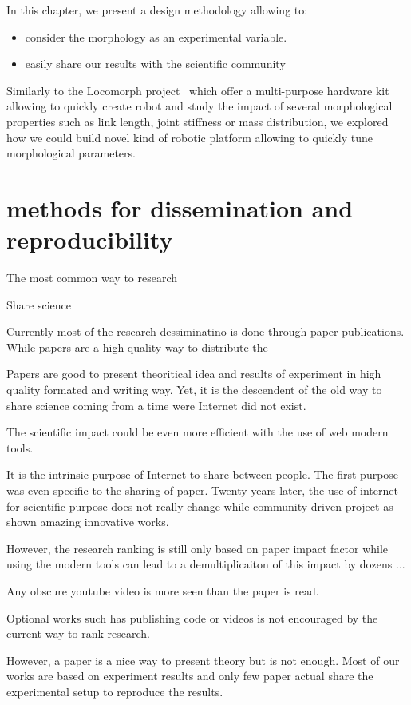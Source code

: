 In this chapter, we present a design methodology allowing to:
\begin{itemize}
    \item consider the morphology as an experimental variable.
    \item easily share our results with the scientific community
\end{itemize}


Similarly to the Locomorph project~\parencite{locomorph} which offer a multi-purpose hardware kit allowing to quickly create robot and study the impact of several morphological properties such as link length, joint stiffness or mass distribution, we explored how we could build novel kind of robotic platform allowing to quickly tune morphological parameters.

\section{methods for dissemination and reproducibility} %

The most common way to  research

Share science

Currently most of the research dessiminatino is done through paper publications.
While papers are a high quality way to distribute the

Papers are good to present theoritical idea and results of experiment in high quality formated and writing way.
Yet, it is the descendent of the old way to share science coming from a time were Internet did not exist.

The scientific impact could be even more efficient with the use of web modern tools.

It is the intrinsic purpose of Internet to share between people.
The first purpose was even specific to the sharing of paper.
Twenty years later, the use of internet for scientific purpose does not really change while community driven project as shown amazing innovative works.

However, the research ranking is still only based on paper impact factor while using the modern tools can lead to a demultiplicaiton of this impact by dozens ...

Any obscure youtube video is more seen than the paper is read.

Optional works such has publishing code or videos is not encouraged by the current way to rank research.

However, a paper is a nice way to present theory but is not enough.
Most of our works are based on experiment results and only few paper actual share the experimental setup to reproduce the results.

